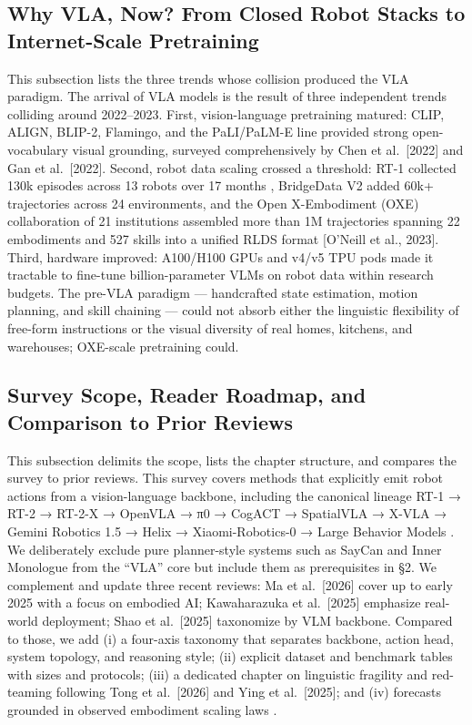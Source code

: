\documentclass{article}
\begin{document}
\subsection{Why VLA, Now? From Closed Robot Stacks to Internet-Scale Pretraining}\label{why-vla-now-from-closed-robot-stacks-to-internet-scale-pretraining}

This subsection lists the three trends whose collision produced the VLA paradigm. The arrival of VLA models is the result of three independent trends colliding around 2022--2023. First, vision-language pretraining matured: CLIP, ALIGN, BLIP-2, Flamingo, and the PaLI/PaLM-E line provided strong open-vocabulary visual grounding, surveyed comprehensively by Chen et al.~{[}2022{]} and Gan et al.~{[}2022{]}. Second, robot data scaling crossed a threshold: RT-1 collected 130k episodes across 13 robots over 17 months \cite{brohan2023rt2visionlanguagea}, BridgeData V2 added 60k+ trajectories across 24 environments, and the Open X-Embodiment (OXE) collaboration of 21 institutions assembled more than 1M trajectories spanning 22 embodiments and 527 skills into a unified RLDS format {[}O'Neill et al., 2023{]}. Third, hardware improved: A100/H100 GPUs and v4/v5 TPU pods made it tractable to fine-tune billion-parameter VLMs on robot data within research budgets. The pre-VLA paradigm --- handcrafted state estimation, motion planning, and skill chaining --- could not absorb either the linguistic flexibility of free-form instructions or the visual diversity of real homes, kitchens, and warehouses; OXE-scale pretraining could.

\subsection{Survey Scope, Reader Roadmap, and Comparison to Prior Reviews}\label{survey-scope-reader-roadmap-and-comparison-to-prior-reviews}

This subsection delimits the scope, lists the chapter structure, and compares the survey to prior reviews. This survey covers methods that explicitly emit robot actions from a vision-language backbone, including the canonical lineage RT-1 → RT-2 → RT-2-X → OpenVLA → π0 → CogACT → SpatialVLA → X-VLA → Gemini Robotics 1.5 → Helix → Xiaomi-Robotics-0 → Large Behavior Models \cite{barreiros2026acarefulexaminatio}. We deliberately exclude pure planner-style systems such as SayCan and Inner Monologue from the ``VLA'' core but include them as prerequisites in §2. We complement and update three recent reviews: Ma et al.~{[}2026{]} cover up to early 2025 with a focus on embodied AI; Kawaharazuka et al.~{[}2025{]} emphasize real-world deployment; Shao et al.~{[}2025{]} taxonomize by VLM backbone. Compared to those, we add (i) a four-axis taxonomy that separates backbone, action head, system topology, and reasoning style; (ii) explicit dataset and benchmark tables with sizes and protocols; (iii) a dedicated chapter on linguistic fragility and red-teaming following Tong et al.~{[}2026{]} and Ying et al.~{[}2025{]}; and (iv) forecasts grounded in observed embodiment scaling laws \cite{ai2025towardsembodiments}.
\end{document}
